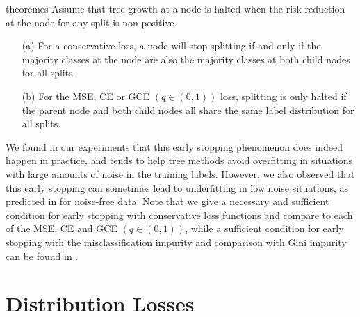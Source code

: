 \documentclass[letterpaper]{article} %
\newcommand{\bn}{{\bm{n}}}
\newcommand{\cM}{{\cal{M}}}
\newcommand{\cS}{{\cal{S}}}
\newcommand{\RR}{{\rm RR}}
\begin{document}
\begin{restatable}{theorem}{es}
\label{thm:early_stopping}
    Assume that tree growth at a node is halted when the risk reduction at the node for any split is non-positive.
    \begin{itemize}
    \item[(a)] For a conservative loss, a node will stop splitting if and only if the majority classes at the node are also the majority classes at both child nodes for all splits.
    \item[(b)] For the MSE, CE or GCE $(q\in(0,1))$ loss, splitting is only halted if the parent node and both child nodes all share the same label distribution for all splits.
    \end{itemize}
\end{restatable}

We found in our experiments that this early stopping phenomenon does indeed happen in practice, and tends to help tree methods avoid overfitting in situations with large amounts of noise in the training labels.
However, we also observed that this early stopping can sometimes lead to underfitting in low noise situations, as predicted in \cite{breiman1984classification} for noise-free data.
Note that we give a necessary and sufficient condition for early stopping with
conservative loss functions and compare to each of the MSE, CE and GCE $(q\in(0,1))$, while a sufficient condition for early stopping with the misclassification impurity and comparison with Gini impurity can be found in \cite{breiman1984classification}.



\section{Distribution Losses}
\label{sec:new-framework}
\end{document}
